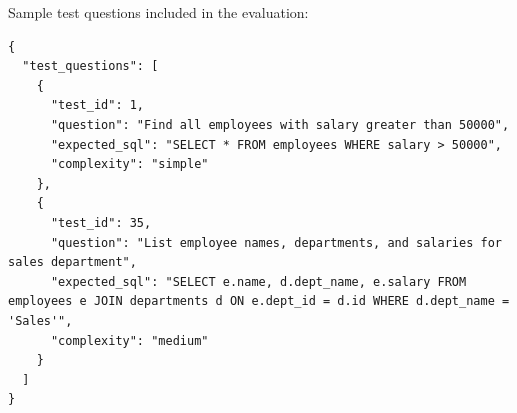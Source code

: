 \documentclass[11pt,a4paper]{article}
\begin{document}
Sample test questions included in the evaluation:

\begin{lstlisting}[caption={Sample test questions from test\_questions.json}]
{
  "test_questions": [
    {
      "test_id": 1,
      "question": "Find all employees with salary greater than 50000",
      "expected_sql": "SELECT * FROM employees WHERE salary > 50000",
      "complexity": "simple"
    },
    {
      "test_id": 35,
      "question": "List employee names, departments, and salaries for sales department",
      "expected_sql": "SELECT e.name, d.dept_name, e.salary FROM employees e JOIN departments d ON e.dept_id = d.id WHERE d.dept_name = 'Sales'",
      "complexity": "medium"
    }
  ]
}
\end{lstlisting}
\end{document}
